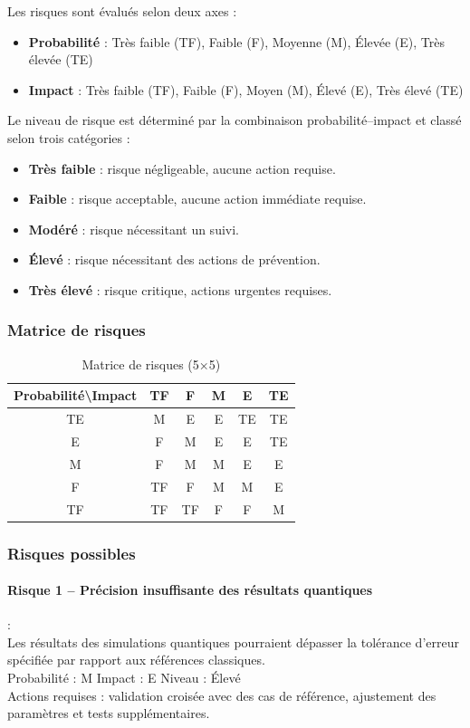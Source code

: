\documentclass[11pt]{article}
\begin{document}
Les risques sont évalués selon deux axes :
\begin{itemize}
    \item \textbf{Probabilité} : Très faible (TF), Faible (F), Moyenne (M), Élevée (E), Très élevée (TE)
    \item \textbf{Impact} : Très faible (TF), Faible (F), Moyen (M), Élevé (E), Très élevé (TE)
\end{itemize}

Le niveau de risque est déterminé par la combinaison probabilité–impact et classé selon trois catégories :
\begin{itemize}
    \item \textbf{Très faible} : risque négligeable, aucune action requise.
    \item \textbf{Faible} : risque acceptable, aucune action immédiate requise.
    \item \textbf{Modéré} : risque nécessitant un suivi.
    \item \textbf{Élevé} : risque nécessitant des actions de prévention.
    \item \textbf{Très élevé} : risque critique, actions urgentes requises.
\end{itemize}

\subsubsection*{Matrice de risques}

\begin{table}[h]
\centering
\begin{tabular}{|c|c|c|c|c|c|}
\hline
\textbf{Probabilité\textbackslash Impact} & TF & F & M & E & TE \\
\hline
TE & M & E & E & TE & TE \\
E  & F & M & E & E  & TE \\
M  & F & M & M & E  & E  \\
F  & TF & F & M & M  & E  \\
TF & TF & TF & F & F  & M  \\
\hline
\end{tabular}
\caption{Matrice de risques (5×5)}
\end{table}

\subsubsection*{Risques possibles}

\paragraph{Risque 1 – Précision insuffisante des résultats quantiques} :\\
Les résultats des simulations quantiques pourraient dépasser la tolérance d’erreur spécifiée par rapport aux références classiques.\\
Probabilité : M \quad Impact : E \quad Niveau : Élevé \\
Actions requises : validation croisée avec des cas de référence, ajustement des paramètres et tests supplémentaires.
\end{document}
